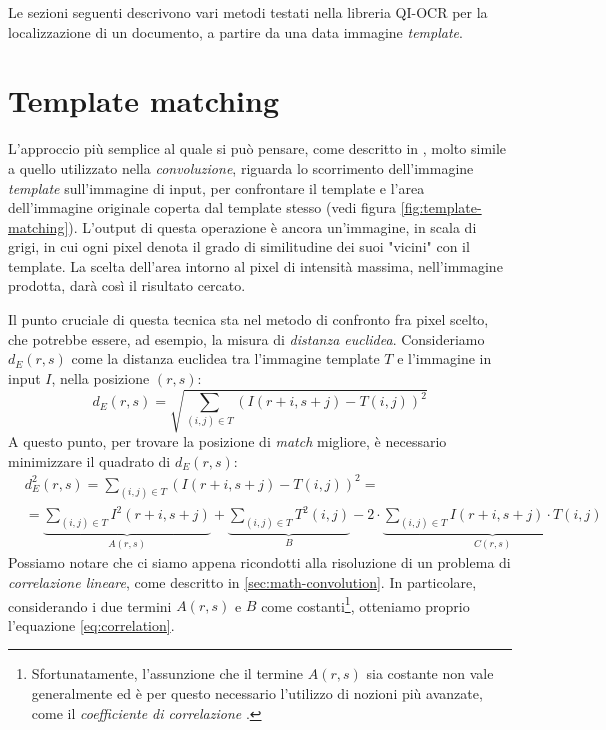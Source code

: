 Le sezioni seguenti descrivono vari metodi testati nella libreria QI-OCR per la localizzazione di un documento, a partire da una data immagine \textit{template}.


\section{Template matching}
\label{sec:template-matching}
L'approccio pi\`u semplice al quale si pu\`o pensare, come descritto in \cite{bib:digital-image-processing}, molto simile a quello utilizzato nella \textit{convoluzione}, riguarda lo scorrimento dell'immagine \textit{template} sull'immagine di input, per confrontare il template e l'area dell'immagine originale coperta dal template stesso (vedi figura \ref{fig:template-matching}). L'output di questa operazione \`e ancora un'immagine, in scala di grigi, in cui ogni pixel denota il grado di similitudine dei suoi "vicini" con il template. La scelta dell'area intorno al pixel di intensit\`a massima, nell'immagine prodotta, dar\`a cos\`i il risultato cercato.\par
Il punto cruciale di questa tecnica sta nel metodo di confronto fra pixel scelto, che potrebbe essere, ad esempio, la misura di \textit{distanza euclidea}. Consideriamo $d_{E}(r, s)$ come la distanza euclidea tra l'immagine template $T$ e l'immagine in input $I$, nella posizione $(r, s)$:
\begin{equation}
	\label{eq:euclidean-distance}
	d_{E}(r, s) = \sqrt{\sum_{(i, j)\in T} (I(r + i, s + j) - T(i, j))^{2}}
\end{equation}
A questo punto, per trovare la posizione di \textit{match} migliore, \`e necessario minimizzare il quadrato di $d_{E}(r, s)$:
\begin{equation}
	\label{eq:euclidean-distance-squared}
	\begin{split}
		& d_{E}^{2}(r, s) = \sum_{(i, j)\in T} (I(r + i, s + j) - T(i, j))^{2} = \\
		& = \underbrace{\sum_{(i, j)\in T} I^{2}(r + i, s + j)}_{A(r,s)} + \underbrace{\sum_{(i, j)\in T} T^{2}(i, j)}_{B} - 2 \cdot \underbrace{\sum_{(i, j)\in T} I(r + i, s + j) \cdot T(i, j)}_{C(r,s)}  
	\end{split}
\end{equation}
Possiamo notare che ci siamo appena ricondotti alla risoluzione di un problema di \textit{correlazione lineare}, come descritto in \ref{sec:math-convolution}. In particolare, considerando i due termini $A(r,s)$ e $B$ come costanti\footnote{Sfortunatamente, l'assunzione che il termine $A(r,s)$ sia costante non vale generalmente ed \`e per questo necessario l'utilizzo di nozioni pi\`u avanzate, come il \textit{coefficiente di correlazione} \cite{bib:digital-image-processing}.}, otteniamo proprio l'equazione \ref{eq:correlation}.\par
